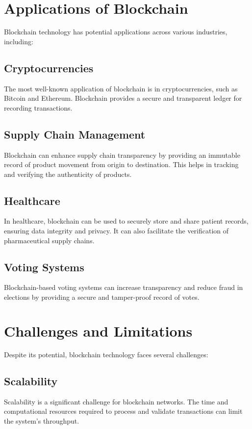 \documentclass[12pt]{article}
\begin{document}
\section{Applications of Blockchain}
Blockchain technology has potential applications across various industries, including:

\subsection{Cryptocurrencies}
The most well-known application of blockchain is in cryptocurrencies, such as Bitcoin and Ethereum. Blockchain provides a secure and transparent ledger for recording transactions.

\subsection{Supply Chain Management}
Blockchain can enhance supply chain transparency by providing an immutable record of product movement from origin to destination. This helps in tracking and verifying the authenticity of products.

\subsection{Healthcare}
In healthcare, blockchain can be used to securely store and share patient records, ensuring data integrity and privacy. It can also facilitate the verification of pharmaceutical supply chains.

\subsection{Voting Systems}
Blockchain-based voting systems can increase transparency and reduce fraud in elections by providing a secure and tamper-proof record of votes.

\section{Challenges and Limitations}
Despite its potential, blockchain technology faces several challenges:

\subsection{Scalability}
Scalability is a significant challenge for blockchain networks. The time and computational resources required to process and validate transactions can limit the system's throughput.
\end{document}
